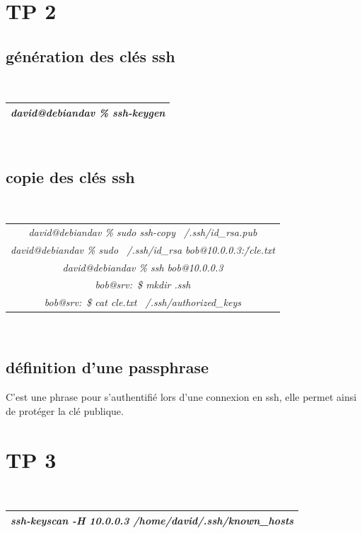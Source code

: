 \documentclass{report}
\begin{document}
\section{TP 2}
\subsection{génération des clés ssh}
\\
\begin{tabular}{|c|}
\hline
\textit{david@debiandav \% ssh-keygen} \\
\hline
\end{tabular}
\\
\subsection{copie des clés ssh}
\\
\begin{tabular}{|c|}
\hline 
\textit{david@debiandav \% sudo ssh-copy ~/.ssh/id\_rsa.pub} \\
\textit{david@debiandav \% sudo ~/.ssh/id\_rsa bob@10.0.0.3:\./cle.txt} \\ 
\textit{david@debiandav \% ssh bob@10.0.0.3} \\
\hline
\textit{bob@srv:~\$ mkdir .ssh} \\
\textit{bob@srv:~\$ cat cle.txt \> ~/.ssh/authorized\_keys} \\
\hline
\end{tabular}
\\

\subsection{définition d'une passphrase}
C'est une phrase pour s'authentifié lors d'une connexion en ssh, 
elle permet ainsi de protéger la clé publique.

\section{TP 3}
\\
\begin{tabular}{|c|}
\hline
\textit{ssh-keyscan -H 10.0.0.3 \> /home/david/.ssh/known\_hosts} \\
\hline
\end{tabular}
\\
\end{document}

